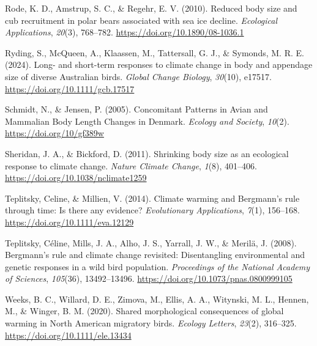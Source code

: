 \documentclass[
]{agujournal2019}
\newlength{\cslhangindent}
\newenvironment{CSLReferences}[2] %
 {\begin{list}{}{%
  \setlength{\itemindent}{0pt}
  \setlength{\leftmargin}{0pt}
  \setlength{\parsep}{0pt}
  \ifodd #1
   \setlength{\leftmargin}{\cslhangindent}
   \setlength{\itemindent}{-1\cslhangindent}
  \fi
  \setlength{\itemsep}{#2\baselineskip}}}
 {\end{list}}
\begin{document}
\begin{CSLReferences}{1}{0}
Rode, K. D., Amstrup, S. C., \& Regehr, E. V. (2010). Reduced body size
and cub recruitment in polar bears associated with sea ice decline.
\emph{Ecological Applications}, \emph{20}(3), 768--782.
\url{https://doi.org/10.1890/08-1036.1}

Ryding, S., McQueen, A., Klaassen, M., Tattersall, G. J., \& Symonds, M.
R. E. (2024). Long- and short-term responses to climate change in body
and appendage size of diverse Australian birds. \emph{Global Change
Biology}, \emph{30}(10), e17517. \url{https://doi.org/10.1111/gcb.17517}

Schmidt, N., \& Jensen, P. (2005). Concomitant {Patterns} in {Avian} and
{Mammalian} {Body} {Length} {Changes} in {Denmark}. \emph{Ecology and
Society}, \emph{10}(2). \url{https://doi.org/10/gf389w}

Sheridan, J. A., \& Bickford, D. (2011). Shrinking body size as an
ecological response to climate change. \emph{Nature Climate Change},
\emph{1}(8), 401--406. \url{https://doi.org/10.1038/nclimate1259}

Teplitsky, Celine, \& Millien, V. (2014). Climate warming and
{Bergmann}'s rule through time: Is there any evidence?
\emph{Evolutionary Applications}, \emph{7}(1), 156--168.
\url{https://doi.org/10.1111/eva.12129}

Teplitsky, Céline, Mills, J. A., Alho, J. S., Yarrall, J. W., \& Merilä,
J. (2008). Bergmann's rule and climate change revisited: {Disentangling}
environmental and genetic responses in a wild bird population.
\emph{Proceedings of the National Academy of Sciences}, \emph{105}(36),
13492--13496. \url{https://doi.org/10.1073/pnas.0800999105}

Weeks, B. C., Willard, D. E., Zimova, M., Ellis, A. A., Witynski, M. L.,
Hennen, M., \& Winger, B. M. (2020). Shared morphological consequences
of global warming in North American migratory birds. \emph{Ecology
Letters}, \emph{23}(2), 316--325.
\url{https://doi.org/10.1111/ele.13434}

\end{CSLReferences}
\end{document}
